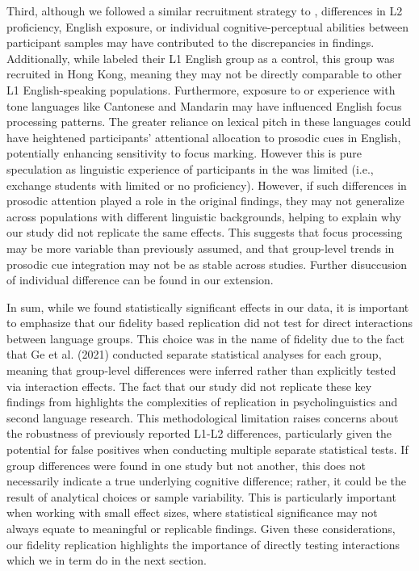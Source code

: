 Third, although we followed a similar recruitment strategy to \citep{Ge2021}, differences in L2 proficiency, English exposure, or individual cognitive-perceptual abilities between participant samples may have contributed to the discrepancies in findings. Additionally, while \citep{Ge2021} labeled their L1 English group as a control, this group was recruited in Hong Kong, meaning they may not be directly comparable to other L1 English-speaking populations. Furthermore, exposure to or experience with tone languages like Cantonese and Mandarin may have influenced English focus processing patterns. The greater reliance on lexical pitch in these languages could have heightened participants’ attentional allocation to prosodic cues in English, potentially enhancing sensitivity to focus marking. However this is pure speculation as linguistic experience of participants in the \citep{Ge2021} was limited (i.e., exchange students with limited or no proficiency). However, if such differences in prosodic attention played a role in the original findings, they may not generalize across populations with different linguistic backgrounds, helping to explain why our study did not replicate the same effects. This suggests that focus processing may be more variable than previously assumed, and that group-level trends in prosodic cue integration may not be as stable across studies. Further disuccusion of individual difference can be found in our extension.

In sum, while we found statistically significant effects in our data, it is important to emphasize that our fidelity based replication did not test for direct interactions between language groups. This choice was in the name of fidelity due to the fact that Ge et al. (2021) conducted separate statistical analyses for each group, meaning that group-level differences were inferred rather than explicitly tested via interaction effects. The fact that our study did not replicate these key findings from \citep{Ge2021} highlights the complexities of replication in psycholinguistics and second language research. This methodological limitation raises concerns about the robustness of previously reported L1-L2 differences, particularly given the potential for false positives when conducting multiple separate statistical tests. If group differences were found in one study but not another, this does not necessarily indicate a true underlying cognitive difference; rather, it could be the result of analytical choices or sample variability. This is particularly important when working with small effect sizes, where statistical significance may not always equate to meaningful or replicable findings. Given these considerations, our fidelity replication highlights the importance of directly testing interactions which we in term do in the next section.


